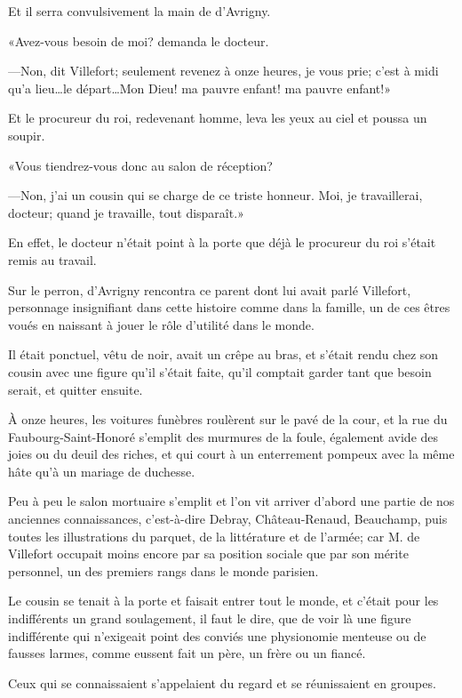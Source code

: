 Et il serra convulsivement la main de d'Avrigny. 

«Avez-vous besoin de moi? demanda le docteur. 

—Non, dit Villefort; seulement revenez à onze heures, je vous prie; c'est à midi qu'a lieu\dots le départ\dots Mon Dieu! ma pauvre enfant! ma pauvre enfant!» 

Et le procureur du roi, redevenant homme, leva les yeux au ciel et poussa un soupir. 

«Vous tiendrez-vous donc au salon de réception? 

—Non, j'ai un cousin qui se charge de ce triste honneur. Moi, je travaillerai, docteur; quand je travaille, tout disparaît.» 

En effet, le docteur n'était point à la porte que déjà le procureur du roi s'était remis au travail. 

Sur le perron, d'Avrigny rencontra ce parent dont lui avait parlé Villefort, personnage insignifiant dans cette histoire comme dans la famille, un de ces êtres voués en naissant à jouer le rôle d'utilité dans le monde. 

Il était ponctuel, vêtu de noir, avait un crêpe au bras, et s'était rendu chez son cousin avec une figure qu'il s'était faite, qu'il comptait garder tant que besoin serait, et quitter ensuite. 

À onze heures, les voitures funèbres roulèrent sur le pavé de la cour, et la rue du Faubourg-Saint-Honoré s'emplit des murmures de la foule, également avide des joies ou du deuil des riches, et qui court à un enterrement pompeux avec la même hâte qu'à un mariage de duchesse. 

Peu à peu le salon mortuaire s'emplit et l'on vit arriver d'abord une partie de nos anciennes connaissances, c'est-à-dire Debray, Château-Renaud, Beauchamp, puis toutes les illustrations du parquet, de la littérature et de l'armée; car M. de Villefort occupait moins encore par sa position sociale que par son mérite personnel, un des premiers rangs dans le monde parisien. 

Le cousin se tenait à la porte et faisait entrer tout le monde, et c'était pour les indifférents un grand soulagement, il faut le dire, que de voir là une figure indifférente qui n'exigeait point des conviés une physionomie menteuse ou de fausses larmes, comme eussent fait un père, un frère ou un fiancé. 

Ceux qui se connaissaient s'appelaient du regard et se réunissaient en groupes. 


